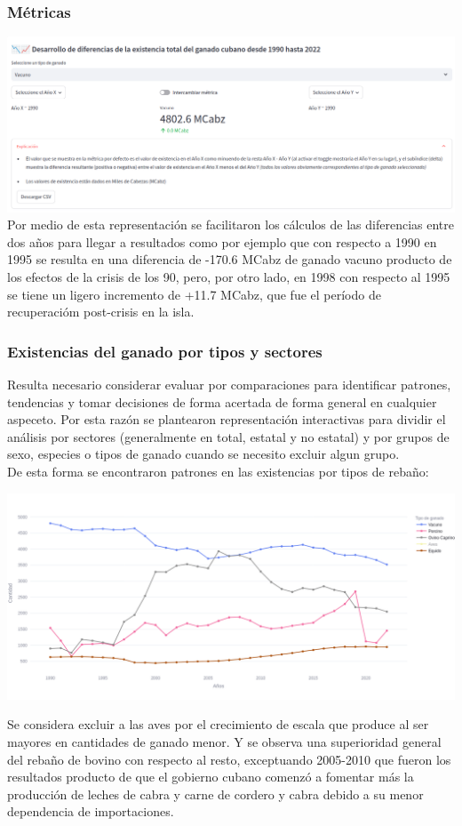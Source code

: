 \documentclass{article}
\begin{document}
\subsubsection{Métricas}
\includegraphics[width=1.0\textwidth]{img/metrics.png}
Por medio de esta representación se facilitaron los cálculos de las diferencias entre dos años para llegar a resultados como por ejemplo que con respecto a 1990 en 1995 se 
resulta en una diferencia de -170.6 MCabz de ganado vacuno producto de los efectos de la crisis de los 90, pero, por otro lado, en 1998 con respecto al 1995 se tiene un 
ligero incremento de +11.7 MCabz, que fue el período de recuperacióm post-crisis en la isla.
\subsubsection{Existencias del ganado por tipos y sectores}
Resulta necesario considerar evaluar por comparaciones para identificar patrones, tendencias y tomar decisiones de forma acertada de forma general en cualquier aspeceto. Por
esta razón se plantearon representación interactivas para dividir el análisis por sectores (generalmente en total, estatal  y no estatal) y por grupos de sexo, especies o 
tipos de ganado cuando se necesito excluir algun grupo.\\

De esta forma se encontraron patrones en las existencias por tipos de rebaño:
\begin{center}
\includegraphics[width=1.0\textwidth]{img/2.png}
\end{center}
Se considera excluir a las aves por el crecimiento de escala que produce al ser mayores en cantidades de ganado menor. Y se observa una superioridad general del rebaño de bovino
con respecto al resto, exceptuando 2005-2010 que fueron los resultados producto de que el gobierno cubano comenzó a fomentar más la producción de leches de cabra y carne de cordero 
y cabra debido a su menor dependencia de importaciones.\\
\end{document}
